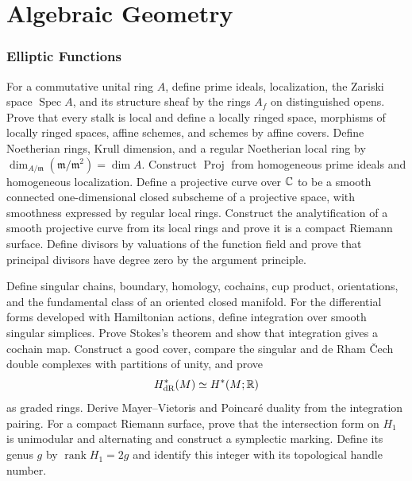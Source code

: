 \part{Algebraic Geometry}

\section{Elliptic Functions}

\begin{exercise}
For a commutative unital ring $A$, define prime ideals, localization, the
Zariski space $\operatorname{Spec}A$, and its structure sheaf by the rings
$A_f$ on distinguished opens.  Prove that every stalk is local and define a
locally ringed space, morphisms of locally ringed spaces, affine schemes, and
schemes by affine covers.  Define Noetherian rings, Krull dimension, and a
regular Noetherian local ring by
$\dim_{A/\mathfrak m}(\mathfrak m/\mathfrak m^2)=\dim A$.  Construct
$\operatorname{Proj}$ from homogeneous prime ideals and homogeneous
localization.  Define a projective curve over
$\mathbb C$ to be a smooth connected one-dimensional closed subscheme of a
projective space, with smoothness expressed by regular local rings.  Construct
the analytification of a smooth projective curve from its local rings and
prove it is a compact Riemann surface.  Define divisors by valuations of the
function field and prove that principal divisors have degree zero by the
argument principle.
\end{exercise}

\begin{exercise}
Define singular chains, boundary, homology, cochains, cup product,
orientations, and the fundamental class of an oriented closed manifold.  For
the differential forms developed with Hamiltonian actions, define integration
over smooth singular simplices.  Prove Stokes's theorem and show that
integration gives a cochain map.  Construct a good cover, compare the singular
and de Rham \v Cech double complexes with partitions of unity, and prove
\[
 H^*_{\rm dR}(M)\simeq H^*(M;\mathbb R)
\]
as graded rings.  Derive Mayer--Vietoris and Poincar\'e duality from the
integration pairing.  For a compact Riemann surface, prove that the
intersection form on $H_1$ is unimodular and alternating and construct a
symplectic marking.  Define its genus $g$ by
$\operatorname{rank}H_1=2g$ and identify this integer with its topological
handle number.
\end{exercise}

